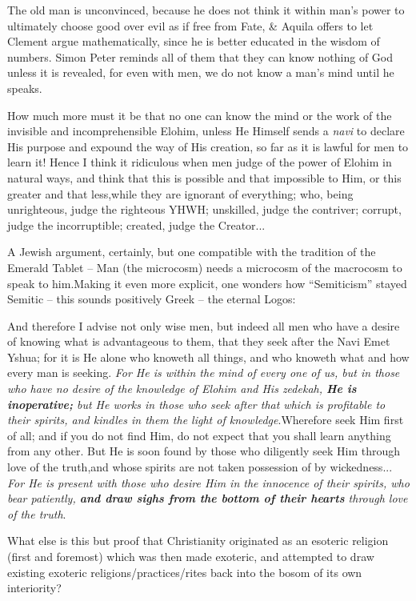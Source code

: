 The old man is unconvinced, because he does not think it within man's power to ultimately choose good over evil as if free from Fate, \& Aquila offers to let Clement argue mathematically, since he is better educated in the wisdom of numbers. Simon Peter reminds all of them that they can know nothing of God unless it is revealed, for even with men, we do not know a man's mind until he speaks.

\begin{quotex}
How much more must it be that no one can know the mind or the work of the invisible and incomprehensible Elohim, unless He Himself sends a \emph{navi} to declare His purpose and expound the way of His creation, so far as it is lawful for men to learn it! Hence I think it ridiculous when men judge of the power of Elohim in natural ways, and think that this is possible and that impossible to Him, or this greater and that less,while they are ignorant of everything; who, being unrighteous, judge the righteous YHWH; unskilled, judge the contriver; corrupt, judge the incorruptible; created, judge the Creator... 
\end{quotex}

A Jewish argument, certainly, but one compatible with the tradition of the Emerald Tablet -- Man (the microcosm) needs a microcosm of the macrocosm to speak to him.Making it even more explicit, one wonders how ``Semiticism'' stayed Semitic -- this sounds positively Greek -- the eternal Logos:

And therefore I advise not only wise men, but indeed all men who have a desire of knowing what is advantageous to them, that they seek after the Navi Emet Yshua; for it is He alone who knoweth all things, and who knoweth what and how every man is seeking. \emph{For He is within the mind of every one of us, but in those who have no desire of the knowledge of Elohim and His zedekah, \textbf{He is inoperative;} but He works in those who seek after that which is profitable to their spirits, and kindles in them the light of knowledge}.Wherefore seek Him first of all; and if you do not find Him, do not expect that you shall learn anything from any other. But He is soon found by those who diligently seek Him through love of the truth,and whose spirits are not taken possession of by wickedness... \emph{For He is present with those who desire Him in the innocence of their spirits, who bear patiently, \textbf{and draw sighs from the bottom of their hearts} through love of the truth}.

What else is this but proof that Christianity originated as an esoteric religion (first and foremost) which was then made exoteric, and attempted to draw existing exoteric religions/practices/rites back into the bosom of its own interiority?

